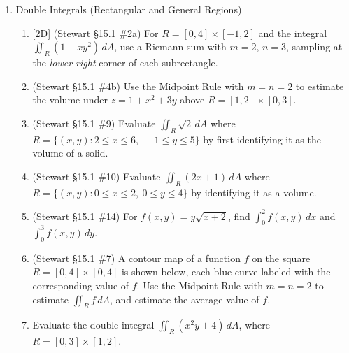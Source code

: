 \documentclass[12pt]{article}
\newcommand{\dimtag}[1]{{\footnotesize\textsc{[#1]}}\;}
\begin{document}
\begin{enumerate}
\item Double Integrals (Rectangular and General Regions)
    \begin{enumerate}
        \item \dimtag{2D} (Stewart \S15.1 \#2a) For $R = [0,4]\times[-1,2]$ and the integral $\iint_R (1 - xy^2)\,dA$, use a Riemann sum with $m=2$, $n=3$, sampling at the \emph{lower right} corner of each subrectangle.
        \item (Stewart \S15.1 \#4b) Use the Midpoint Rule with $m=n=2$ to estimate the volume under $z = 1 + x^2 + 3y$ above $R=[1,2]\times[0,3]$.
        \item (Stewart \S15.1 \#9) Evaluate $\iint_R \sqrt{2}\,dA$ where $R = \{(x,y) : 2\leq x\leq 6,\ -1\leq y \leq 5\}$ by first identifying it as the volume of a solid.
        \item (Stewart \S15.1 \#10) Evaluate $\iint_R (2x+1)\,dA$ where $R=\{(x,y): 0\leq x \leq 2,\ 0\leq y\leq 4\}$ by identifying it as a volume.
        \item (Stewart \S15.1 \#14) For $f(x,y) = y\sqrt{x+2}$, find $\int_0^2 f(x,y)\, dx$ and $\int_0^3 f(x,y)\,dy$.
        \item (Stewart \S15.1 \#7) A contour map of a function $f$ on the square $R=[0,4]\times[0,4]$ is shown below, each blue curve labeled with the corresponding value of $f$. Use the Midpoint Rule with $m=n=2$ to estimate $\iint_R f\,dA$, and estimate the average value of $f$.
        \begin{center}
        \end{center}
        \item Evaluate the double integral $\iint_{R} (x^2y + 4) \, dA$, where $R = [0, 3] \times [1, 2]$.

\end{enumerate}
\end{enumerate}
\end{document}
